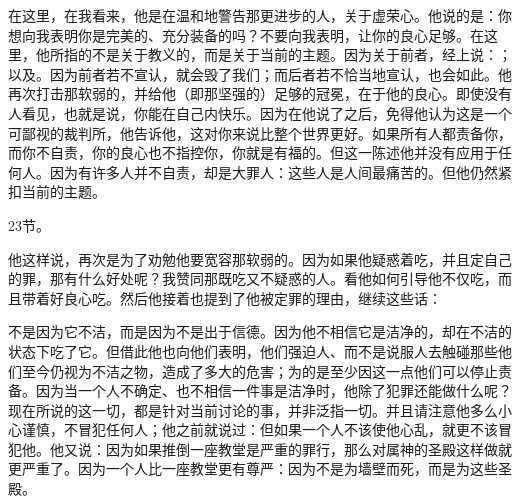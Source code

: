 在这里，在我看来，他是在温和地警告那更进步的人，关于虚荣心。他说的是：你想向我表明你是完美的、充分装备的吗？不要向我表明，让你的良心足够。在这里，他所指的不是关于教义的，而是关于当前的主题。因为关于前者，经上说：；以及。因为前者若不宣认，就会毁了我们；而后者若不恰当地宣认，也会如此。他再次打击那软弱的，并给他（即那坚强的）足够的冠冕，在于他的良心。即使没有人看见，也就是说，你能在自己内快乐。因为在他说了之后，免得他认为这是一个可鄙视的裁判所，他告诉他，这对你来说比整个世界更好。如果所有人都责备你，而你不自责，你的良心也不指控你，你就是有福的。但这一陈述他并没有应用于任何人。因为有许多人并不自责，却是大罪人：这些人是人间最痛苦的。但他仍然紧扣当前的主题。\par

23节。\par

他这样说，再次是为了劝勉他要宽容那软弱的。因为如果他疑惑着吃，并且定自己的罪，那有什么好处呢？我赞同那既吃又不疑惑的人。看他如何引导他不仅吃，而且带着好良心吃。然后他接着也提到了他被定罪的理由，继续这些话：\par

不是因为它不洁，而是因为不是出于信德。因为他不相信它是洁净的，却在不洁的状态下吃了它。但借此他也向他们表明，他们强迫人、而不是说服人去触碰那些他们至今仍视为不洁之物，造成了多大的危害；为的是至少因这一点他们可以停止责备。因为当一个人不确定、也不相信一件事是洁净时，他除了犯罪还能做什么呢？现在所说的这一切，都是针对当前讨论的事，并非泛指一切。并且请注意他多么小心谨慎，不冒犯任何人；他之前就说过：但如果一个人不该使他心乱，就更不该冒犯他。他又说：因为如果推倒一座教堂是严重的罪行，那么对属神的圣殿这样做就更严重了。因为一个人比一座教堂更有尊严：因为不是为墙壁而死，而是为这些圣殿。\par

